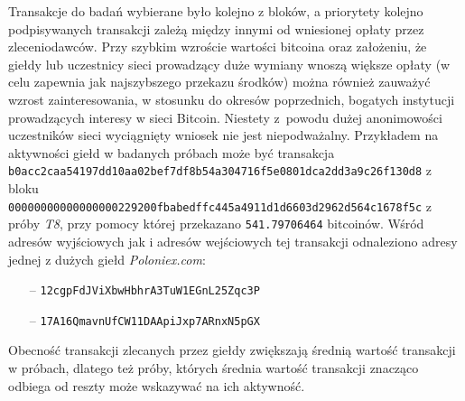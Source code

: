 \documentclass[12pt, twoside, final, openany]{mgr}
\begin{document}
\indent Transakcje do badań wybierane było kolejno z bloków, a priorytety kolejno podpisywanych transakcji zależą między innymi od wniesionej opłaty przez zleceniodawców. Przy szybkim wzroście wartości bitcoina oraz założeniu, że giełdy lub uczestnicy sieci prowadzący duże wymiany wnoszą większe opłaty (w celu zapewnia jak najszybszego przekazu środków) można również zauważyć wzrost zainteresowania, w stosunku do okresów poprzednich, bogatych instytucji prowadzących interesy w sieci Bitcoin. Niestety z~powodu dużej anonimowości uczestników sieci wyciągnięty wniosek nie jest niepodważalny. 
\newpage
\indent Przykładem na aktywności giełd w badanych próbach może być transakcja\\\texttt{b0acc2caa54197dd10aa02bef7df8b54a304716f5e0801dca2dd3a9c26f130d8} z bloku\\ \texttt{00000000000000000229200fbabedffc445a4911d1d6603d2962d564c1678f5c} z próby \textit{T8}, przy pomocy której przekazano \texttt{541.79706464} bitcoinów. Wśród adresów wyjściowych jak i adresów wejściowych tej transakcji odnaleziono adresy jednej z dużych giełd \textit{Poloniex.com}\cite{poloniex}:
\begin{itemize}
\item[--] \texttt{12cgpFdJViXbwHbhrA3TuW1EGnL25Zqc3P}
\item[--] \texttt{17A16QmavnUfCW11DAApiJxp7ARnxN5pGX}
\end{itemize}
Obecność transakcji zlecanych przez giełdy zwiększają średnią wartość transakcji w próbach, dlatego też próby, których średnia wartość transakcji znacząco odbiega od reszty może wskazywać na ich aktywność.
\end{document}
